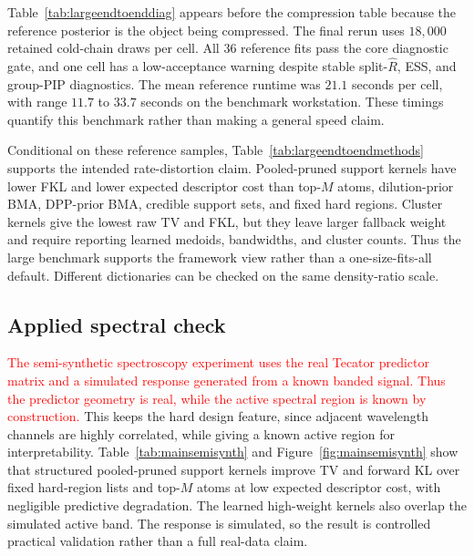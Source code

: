 \documentclass[twoside,11pt]{article}
\newcommand{\rev}[1]{\textcolor{red}{#1}}
\begin{document}
Table~\ref{tab:largeendtoenddiag} appears before the compression table because the reference posterior is the object being compressed. The final rerun uses \(18{,}000\) retained cold-chain draws per cell. All \(36\) reference fits pass the core diagnostic gate, and one cell has a low-acceptance warning despite stable split-\(\widehat R\), ESS, and group-PIP diagnostics. The mean reference runtime was \(21.1\) seconds per cell, with range \(11.7\) to \(33.7\) seconds on the benchmark workstation. These timings quantify this benchmark rather than making a general speed claim.

\begin{table}[!htbp]
\centering
\small

\caption{Reference diagnostics for the large \(p=100\) benchmark.}
\label{tab:largeendtoenddiag}
\end{table}

Conditional on these reference samples, Table~\ref{tab:largeendtoendmethods} supports the intended rate-distortion claim. Pooled-pruned support kernels have lower FKL and lower expected descriptor cost than top-\(M\) atoms, dilution-prior BMA, DPP-prior BMA, credible support sets, and fixed hard regions. Cluster kernels give the lowest raw TV and FKL, but they leave larger fallback weight and require reporting learned medoids, bandwidths, and cluster counts. Thus the large benchmark supports the framework view rather than a one-size-fits-all default. Different dictionaries can be checked on the same density-ratio scale.

\begin{table}[!htbp]
\centering
\scriptsize

\caption{Large \(p=100\) benchmark. Storage is expected descriptor cost, and List is active kernels or stored atoms. \rev{Parentheses are standard errors when shown.} Dilution and DPP rows are target-shift diagnostics.}
\label{tab:largeendtoendmethods}
\end{table}

\subsection{Applied spectral check}
\label{subsec:appliedchecks}

\rev{The semi-synthetic spectroscopy experiment uses the real Tecator predictor matrix and a simulated response generated from a known banded signal. Thus the predictor geometry is real, while the active spectral region is known by construction.} This keeps the hard design feature, since adjacent wavelength channels are highly correlated, while giving a known active region for interpretability. Table~\ref{tab:mainsemisynth} and Figure~\ref{fig:mainsemisynth} show that structured pooled-pruned support kernels improve TV and forward KL over fixed hard-region lists and top-\(M\) atoms at low expected descriptor cost, with negligible predictive degradation. The learned high-weight kernels also overlap the simulated active band. The response is simulated, so the result is controlled practical validation rather than a full real-data claim.
\end{document}
